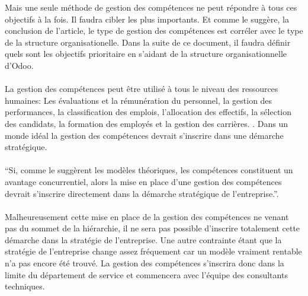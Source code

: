 Mais une seule méthode de gestion des compétences ne peut répondre à tous ces objectifs à la fois. Il faudra cibler les  plus importants. Et comme le suggère, la conclusion de l'article\citep{delobbe}, le type de gestion des compétences est corréler avec le type de la structure organisationelle. Dans la suite de ce document, il faudra définir quels sont les objectifs prioritaire en s'aidant de la structure organisationnelle d'Odoo. 

\paragraph{}La gestion des compétences peut être utilisé à tous le niveau des ressources humaines: Les évaluations et la rémunération du personnel, la gestion des performances, la classification des emplois, l'allocation des effectifs, la sélection des candidats, la formation des employés et la gestion des carrières. \citep[p.32]{delobbe}. Dans un monde idéal la gestion des compétences devrait s'inscrire dans une démarche stratégique. 

\paragraph{}\enquote{Si, comme le suggèrent les modèles théoriques, les compétences constituent un avantage concurrentiel, alors la mise en place d'une gestion des compétences devrait s'inscrire directement dans la démarche stratégique de l'entreprise.}\citep[P. 188]{gestionressourceshumaine2007}.

\paragraph{}Malheureusement cette mise en place de la gestion des compétences ne venant pas du sommet de la hiérarchie, il ne sera pas possible d'inscrire totalement cette démarche dans la stratégie de l'entreprise. Une autre contrainte étant que la stratégie de l'entreprise change assez fréquement car un modèle vraiment rentable n'a pas encore été trouvé. La gestion des compétences s'inscrira donc dans la limite du département de service et commencera avec l'équipe des consultants techniques. 
